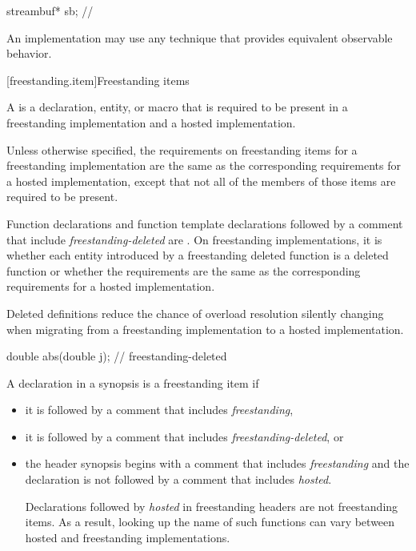 \begin{codeblock}
streambuf* sb;      // \expos
\end{codeblock}

\pnum
An implementation may use any technique that provides equivalent observable behavior.

[freestanding.item]{Freestanding items}

\pnum
{}%
A  is
a declaration, entity, or macro
that is required to be present in
a freestanding implementation and a hosted implementation.

\pnum
Unless otherwise specified,
the requirements on freestanding items for a freestanding implementation
are the same as the corresponding requirements for a hosted implementation,
except that not all of the members of those items are required to be present.

\pnum
Function declarations and function template declarations
followed by a comment that include \textit{freestanding-deleted} are
.
On freestanding implementations,
it is 
whether each entity introduced by a freestanding deleted function
is a deleted function or
whether the requirements are the same as
the corresponding requirements for a hosted implementation.
\begin{note}
Deleted definitions reduce the chance of overload resolution silently changing
when migrating from a freestanding implementation to a hosted implementation.
\end{note}
\begin{example}
\begin{codeblock}
double abs(double j);           // freestanding-deleted
\end{codeblock}
\end{example}

\pnum
{}%
A declaration in a synopsis is a freestanding item if
\begin{itemize}
\item it is followed by a comment that includes \textit{freestanding},
\item it is followed by a comment that includes \textit{freestanding-deleted}, or
\item the header synopsis begins with a comment
that includes \textit{freestanding} and
the declaration is not followed by a comment that includes \textit{hosted}.
\begin{note}
Declarations followed by \textit{hosted} in freestanding headers are
not freestanding items.
As a result, looking up the name of such functions can vary
between hosted and freestanding implementations.
\end{note}
\end{itemize}
\begin{example}
\begin{codeblock}
// all freestanding
namespace std {
\end{codeblock}
\end{example}

